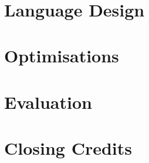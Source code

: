 \documentclass[10pt,a4paper,final,oneside,openany]{memoir}
\begin{document}
\frontmatter

 \clearpage

\maketitle
~
\vspace{3cm}
  \begin{abstract}

  \end{abstract}

\setlength{\cftpartnumwidth}{4em}

\clearpage
\tableofcontents*

\mainmatter
{}


\nocite{uffe}

\part{Language Design}
\label{part:languagedesign}







\part{Optimisations}









\part{Evaluation}





\clearpage

\part{Closing Credits}

{}
\printbibliography

\backmatter
\appendix

\end{document}
